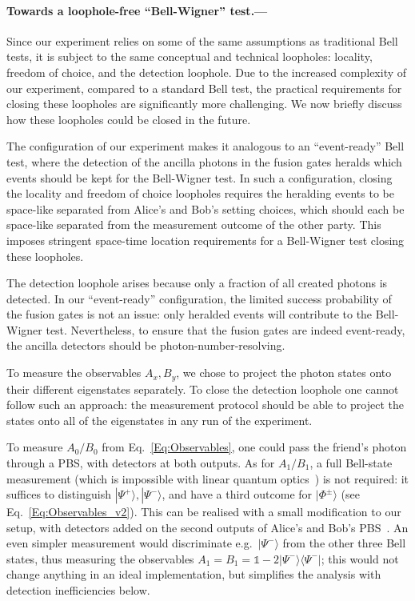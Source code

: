 \documentclass[aps,floatfix,superscriptaddress,twocolumn,tightenlines,amsmath,amssymb,nofootinbib,10pt]{revtex4-1}
\newcommand{\ket}[1] {| #1 \rangle}
\newcommand{\ketbra}[1]{ | #1 \rangle\!\langle #1 |}
\newcommand{\id}{\mathds{1}}
\begin{document}
\bigskip
\paragraph*{Towards a loophole-free ``Bell-Wigner'' test.--- } 
Since our experiment relies on some of the same assumptions as traditional Bell tests, it is subject to the same conceptual and technical loopholes: locality, freedom of choice, and the detection loophole. Due to the increased complexity of our experiment, compared to a standard Bell test, the practical requirements for closing these loopholes are significantly more challenging. We now briefly discuss how these loopholes could be closed in the future.

The configuration of our experiment makes it analogous to an ``event-ready'' Bell test, where the detection of the ancilla photons in the fusion gates heralds which events should be kept for the Bell-Wigner test. In such a configuration, closing the locality and freedom of choice loopholes requires the heralding events to be space-like separated from Alice's and Bob's setting choices, which should each be space-like separated from the measurement outcome of the other party. This imposes stringent space-time location requirements for a Bell-Wigner test closing these loopholes.

The detection loophole arises because only a fraction of all created photons is detected. In our ``event-ready'' configuration, the limited success probability of the fusion gates is not an issue: only heralded events will contribute to the Bell-Wigner test. Nevertheless, to ensure that the fusion gates are indeed event-ready, the ancilla detectors should be photon-number-resolving. 

To measure the observables $A_x, B_y$, we chose to project the photon states onto their different eigenstates separately. To close the detection loophole one cannot follow such an approach: the measurement protocol should be able to project the states onto all of the eigenstates in any run of the experiment.

To measure $A_0/B_0$ from Eq.~\eqref{Eq:Observables}, one could pass the friend's photon through a PBS, with detectors at both outputs. As for $A_1/B_1$, a full Bell-state measurement (which is impossible with linear quantum optics~\cite{Calsamiglia2001}) is not required: it suffices to distinguish $\ket{\Psi^+}, \ket{\Psi^-}$, and have a third outcome for $\ket{\Phi^\pm}$ (see Eq.~\eqref{Eq:Observables_v2}). This can be realised with a small modification to our setup, with detectors added on the second outputs of Alice's and Bob's PBS~\cite{Braunstein1995}. An even simpler measurement would discriminate e.g.\ $\ket{\Psi^-}$ from the other three Bell states, thus measuring the observables $A_1 = B_1 = \id - 2 \ketbra{\Psi^-}$; this would not change anything in an ideal implementation, but simplifies the analysis with detection inefficiencies below.
\end{document}
